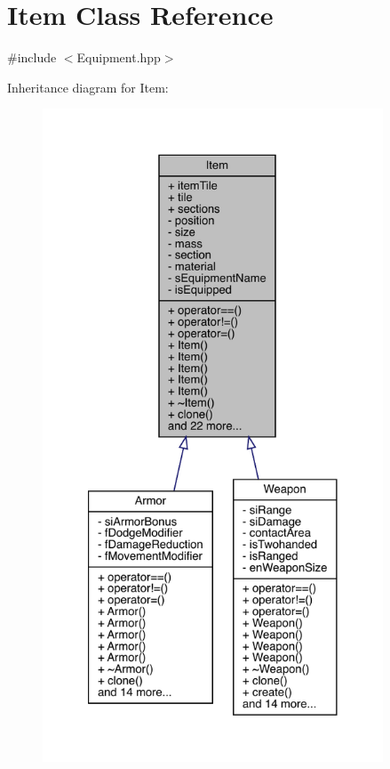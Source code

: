 \hypertarget{class_item}{}\section{Item Class Reference}
\label{class_item}


{\ttfamily \#include $<$Equipment.\+hpp$>$}



Inheritance diagram for Item\+:
\nopagebreak
\begin{figure}[H]
\begin{center}
\leavevmode
\includegraphics[height=550pt]{class_item__inherit__graph}
\end{center}
\end{figure}


